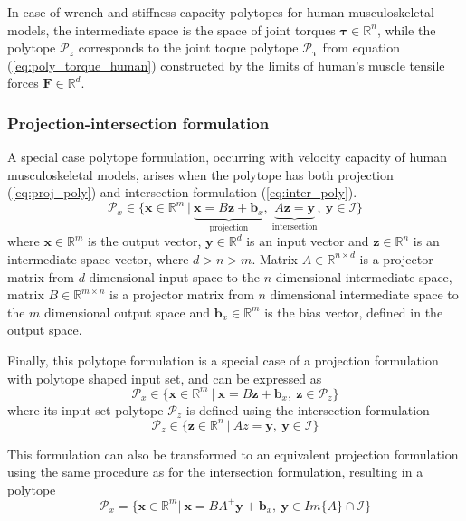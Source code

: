 In case of wrench and stiffness capacity polytopes for human musculoskeletal models, the intermediate space is the space of joint torques $\bm{\tau}\in\mathbb{R}^n$, while the polytope $\mathcal{P}_z$ corresponds to the joint toque polytope $\mathcal{P}_{\bm{\tau}}$ from equation (\ref{eq:poly_torque_human}) constructed by the limits of human's muscle tensile forces $\bm{F}\in\mathbb{R}^d$.


\subsubsection{Projection-intersection formulation}
A special case polytope formulation, occurring with velocity capacity of human musculoskeletal models, arises when the polytope has both projection (\ref{eq:proj_poly}) and intersection formulation (\ref{eq:inter_poly}). 
\begin{equation}
    \mathcal{P}_x \in \{\bm{x}\in \mathbb{R}^m~|~ \underbrace{\bm{x} = B \bm{z} + \bm{b}_x}_{\text{projection}},~ \underbrace{A\bm{z}=\bm{y}}_{\text{intersection}},~ \bm{y} \in \mathcal{I}\} 
\end{equation}
where $\bm{x}\in\mathbb{R}^m$ is the output vector, $\bm{y} \in \mathbb{R}^d$ is an input vector and $\bm{z}\in\mathbb{R}^n$ is an intermediate space vector, where $d\!>\!n\!>\!m$. Matrix $A\in \mathbb{R}^{n \times d}$ is a projector matrix from $d$ dimensional input space to the $n$ dimensional intermediate space, matrix $B\in \mathbb{R}^{m\times n}$ is a projector matrix from $n$ dimensional intermediate space to the $m$ dimensional output space and $\bm{b}_x\in\mathbb{R}^m$ is the bias vector, defined in the output space.

Finally, this polytope formulation is a special case of a projection formulation with polytope shaped input set, and can be expressed as
\begin{equation}
    \mathcal{P}_x \in \{\bm{x}\in \mathbb{R}^m~|~ \bm{x} = B\bm{z} + \bm{b}_x,~ \bm{z} \in \mathcal{P}_z\} 
\end{equation}
where its input set polytope $\mathcal{P}_z$ is defined using the intersection formulation
\begin{equation}
    \mathcal{P}_z \in \{\bm{z}\in \mathbb{R}^n~|~Az = \bm{y},~ \bm{y} \in \mathcal{I}\} 
\end{equation}

This formulation can also be transformed to an equivalent projection formulation using the same procedure as for the intersection formulation, resulting in a polytope 
\begin{equation}
\mathcal{P}_x=\{\bm{x} \in \mathbb{R}^m |~ \bm{x} = BA^+\bm{y} + \bm{b}_x,~ \bm{y}\in Im\{A\}\cap\mathcal{I}\} 
\end{equation}

